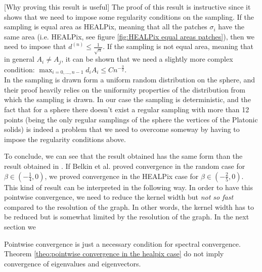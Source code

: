 [Why proving this result is useful] The proof of this result is instructive since it shows that we need to impose some regularity conditions on the sampling. If the sampling is equal area as HEALPix, meaning that all the patches $\sigma_i$ have the same area (i.e. HEALPix, see figure \ref{fig:HEALPix equal areas patches}), then we need to impose that $ d^{(n)}\leq \frac{1}{\sqrt{n}}$. If the sampling is not equal area, meaning that in general $A_i\neq A_j$, it can be shown that we need a slightly more complex condition: $\max_{i=0,...,n-1}d_iA_i\leq Cn^{-\frac{3}{2}}$.\\
In \cite{Belkin:2005:TTF:2138147.2138189} the sampling is drawn form a uniform random distribution on the sphere, and their proof heavily relies on the uniformity properties of the distribution from which the sampling is drawn. In our case the sampling is deterministic, and the fact that for a sphere there doesn't exist a regular sampling with more than 12 points (being the only regular samplings of the sphere the vertices of the Platonic solids) is indeed a problem that we need to overcome someway by having to impose the regularity conditions above. 


To conclude, we can see that the result obtained has the same form than the result obtained in \cite{Belkin:2005:TTF:2138147.2138189}. If Belkin et al. proved convergence in the random case for $\beta \in (-\frac{1}{4}, 0)$, we proved convergence in the HEALPix case for $\beta \in (-\frac{2}{5}, 0)$. This kind of result can be interpreted in the following way. In order to have this pointwise convergence, we need to reduce the kernel width but \textit{not so fast} compared to the resolution of the graph. In other words, the kernel width has to be reduced but is somewhat limited by the resolution of the graph. In the next section we
\begin{remark}
	Pointwise convergence is just a necessary condition for spectral convergence.  Theorem \ref{theo:pointwise convergence in the healpix case} do not imply convergence of eigenvalues and eigenvectors.
\end{remark}

\clearpage
